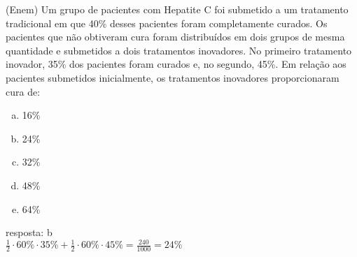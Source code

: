 \begin{ex}
   (Enem) Um grupo de pacientes com Hepatite C foi submetido a um tratamento tradicional em que 40\% desses pacientes foram completamente curados. 
   Os pacientes que não obtiveram cura foram distribuídos em dois grupos de mesma quantidade e submetidos a dois tratamentos inovadores. 
   No primeiro tratamento inovador, 35\% dos pacientes foram curados e, no segundo, 45\%.
   Em relação aos pacientes submetidos inicialmente, os tratamentos inovadores proporcionaram cura de:
      \begin{enumerate} [(a)]
          \item 16\%
          \item 24\%
          \item 32\%
          \item 48\%
          \item 64\%
      \end{enumerate}
        \begin{sol}
        resposta: b\\
        $\frac{1}{2}\cdot60\%\cdot35\%+\frac{1}{2}\cdot60\%\cdot45\%=\frac{240}{1000}=24\%$
        \end{sol}
  \end{ex}